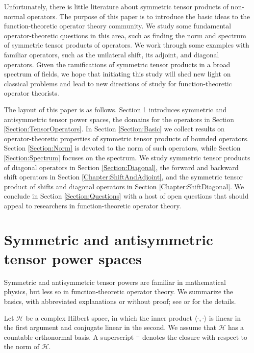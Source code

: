 \documentclass[10pt,reqno]{amsart}
\newcommand{\0}{{\color{lightgray}0}}
\newcommand{\h}{\mathcal{H}}
\theoremstyle{definition}
\newcounter{problem}
\numberwithin{equation}{section}
\begin{document}
Unfortunately, there is little literature about symmetric tensor products of non-normal operators. 
The purpose of this paper is to introduce the basic ideas to the function-theoretic operator theory community. We study some fundamental operator-theoretic questions in this area, such as finding the norm and spectrum of symmetric tensor products of operators. We work through some examples with familiar operators, such as the unilateral shift, its adjoint, and diagonal operators. Given the ramifications of symmetric tensor products in a broad spectrum of fields, we hope that initiating this study will shed new light on classical problems and lead to new directions of study for function-theoretic operator theorists.

The layout of this paper is as follows. Section \ref{Subsection:TensorSpace} introduces symmetric and antisymmetric tensor power spaces, the domains for the operators in Section \ref{Section:TensorOperators}. In Section \ref{Section:Basic} we collect results on operator-theoretic properties of symmetric tensor products of bounded operators.
Section \ref{Section:Norm} is devoted to the norm of such operators, while
Section \ref{Section:Spectrum} focuses on the spectrum.
We study symmetric tensor products of diagonal operators in Section \ref{Section:Diagonal},
the forward and backward shift operators in Section \ref{Chapter:ShiftAndAdjoint}, and  
the symmetric tensor product of shifts and diagonal operators in Section \ref{Chapter:ShiftDiagonal}.
We conclude in Section \ref{Section:Questions} with a host of open questions that should appeal to researchers in function-theoretic operator theory.



\section{Symmetric and antisymmetric tensor power spaces}\label{Subsection:TensorSpace}



Symmetric and antisymmetric tensor powers are familiar in mathematical physics, 
but less so in function-theoretic operator theory.  We summarize the basics, with abbreviated explanations
or without proof; see \cite[Sec.~I.5]{Bhatia} or \cite[Section 3.8]{SimonReal} for the details.

Let $\h$ be a complex Hilbert space, in which the inner product $\langle \cdot, \cdot \rangle$
is linear in the first argument and conjugate linear in the second.
We assume that $\h$ has a countable orthonormal basis. A superscript $^-$ denotes the closure with respect to the norm of $\h$.
\end{document}
